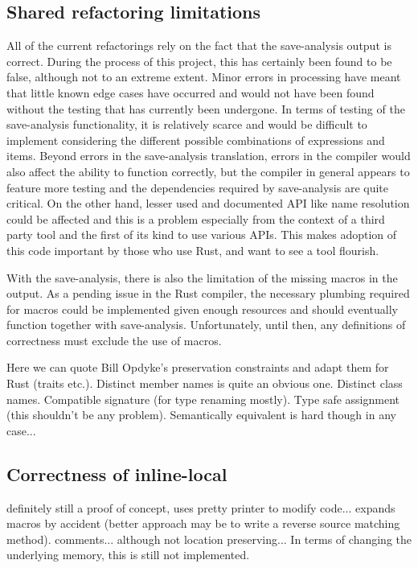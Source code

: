 \subsection{Shared refactoring limitations}
All of the current refactorings rely on the fact that the save-analysis output is correct. During the process of this project, this has certainly been found to be false, although not to an extreme extent. Minor errors in processing have meant that little known edge cases have occurred and would not have been found without the testing that has currently been undergone. In terms of testing of the save-analysis functionality, it is relatively scarce and would be difficult to implement considering the different possible combinations of expressions and items. Beyond errors in the save-analysis translation, errors in the compiler would also affect the ability to function correctly, but the compiler in general appears to feature more testing and the dependencies required by save-analysis are quite critical. On the other hand, lesser used and documented API like name resolution could be affected and this is a problem especially from the context of a third party tool and the first of its kind to use various APIs. This makes adoption of this code important by those who use Rust, and want to see a tool flourish.

With the save-analysis, there is also the limitation of the missing macros in the output. As a pending issue in the Rust compiler, the necessary plumbing required for macros could be implemented given enough resources and should eventually function together with save-analysis. Unfortunately, until then, any definitions of correctness must exclude the use of macros. 

Here we can quote Bill Opdyke's preservation constraints and adapt them for Rust (traits etc.). Distinct member names is quite an obvious one. Distinct class names. Compatible signature (for type renaming mostly). Type safe assignment (this shouldn't be any problem). Semantically equivalent is hard though in any case... 

\subsection{Correctness of inline-local}
definitely still a proof of concept, uses pretty printer to modify code... expands macros by accident (better approach may be to write a reverse source matching method). comments... although not location preserving... In terms of changing the underlying memory, this is still not implemented. 



